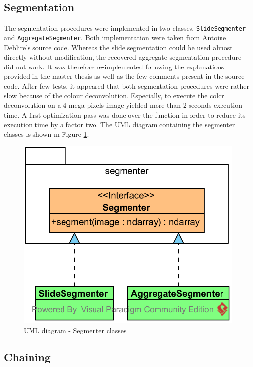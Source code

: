 \subsection{Segmentation}

The segmentation procedures were implemented in two classes, \texttt{SlideSegmenter} and \texttt{AggregateSegmenter}. Both implementation were taken from Antoine Deblire's source code. Whereas the slide segmentation could be used almost directly without modification, the recovered aggregate segmentation procedure did not work. It was therefore re-implemented following the explanations provided in the master thesis as well as the few comments present in the source code. After few tests, it appeared that both segmentation procedures were rather slow because of the colour deconvolution. Especially, to execute the color deconvolution on a 4 mega-pixels image yielded more than 2 seconds execution time. A first optimization pass was done over the function in order to reduce its execution time by a factor two. The UML diagram containing the segmenter classes is shown in Figure \ref{fig:uml_cyto_segmenters}.

\begin{figure}
	\center
	\includegraphics[scale=0.85]{image/thyroid_segmenters.png}
	\caption{UML diagram - Segmenter classes}
	\label{fig:uml_cyto_segmenters}
\end{figure}

\subsection{Chaining}

